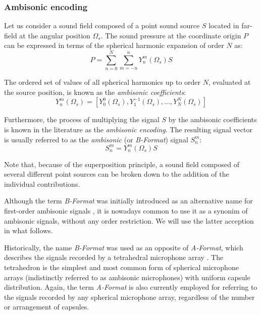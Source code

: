 \newpage
\subsubsection{Ambisonic encoding}

Let us consider a sound field composed of a point sound source $S$ located in far-field at the angular position $\Omega_s$. The sound pressure at the coordinate origin $P$ can be expressed in terms of the spherical harmonic expansion of order $N$ as: 
\begin{equation}
	P = \sum_{n=0}^{N} \sum_{m=-n}^{n} Y_n^m(\Omega_s) S
	\label{eq:encoding}
\end{equation}


The ordered set of values of all spherical harmonics up to order $N$, evaluated at the source position, is known as the \textit{ambisonic coefficients}:
\begin{equation}
	Y_n^m(\Omega_s) = [Y_0^0(\Omega_s), Y_1^{-1}(\Omega_s),  \ldots ,  Y_N^N(\Omega_s)]
	\label{eq:sphericalharmonicvector}
\end{equation}

Furthermore, the process of multiplying the signal $S$ by the ambisonic coefficients is known in the literature as the \textit{ambisonic encoding}. The resulting signal vector is usually referred to as the \textit{ambisonic} (or \textit{B-Format}) signal $S_n^m$:
\begin{equation}
	S_n^m = Y_n^m(\Omega_s) S
\end{equation}

Note that, because of the superposition principle, a sound field composed of several different point sources can be broken down to the addition of the individual contributions. 

Although the term \textit{B-Format} was initially introduced as an alternative name for first-order ambisonic signals \cite{daniel2000representation}, it is nowadays common to use it as a synonim of ambisonic signals, without any order restriction. We will use the latter acception in what follows.

Historically, the name \textit{B-Format} was used as an opposite of \textit{A-Format}, which describes the signals recorded by a tetrahedral microphone array \cite{gerzon1975design}. The tetrahedron is the simplest and most common form of spherical microphone arrays (indistinctly referred to as ambisonic microphones) with uniform capsule distribution. Again, the term \textit{A-Format} is also currently employed for referring to the signals recorded by any spherical microphone array, regardless of the number or arrangement of capsules.

